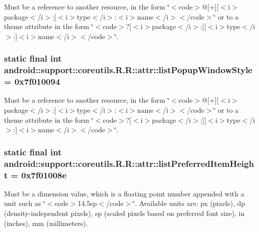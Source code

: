 Must be a reference to another resource, in the form \char`\"{}$<$code$>$@\mbox{[}+\mbox{]}\mbox{[}$<$i$>$package$<$/i$>$:\mbox{]}$<$i$>$type$<$/i$>$:$<$i$>$name$<$/i$>$$<$/code$>$\char`\"{} or to a theme attribute in the form \char`\"{}$<$code$>$?\mbox{[}$<$i$>$package$<$/i$>$:\mbox{]}\mbox{[}$<$i$>$type$<$/i$>$:\mbox{]}$<$i$>$name$<$/i$>$$<$/code$>$\char`\"{}. \hypertarget{classandroid_1_1support_1_1coreutils_1_1_r_1_1attr_4730c57033e903da9d16ba64f8d0acbf}{
\subsubsection[{listPopupWindowStyle}]{\setlength{\rightskip}{0pt plus 5cm}static final int android::support::coreutils.R.R::attr::listPopupWindowStyle = 0x7f010094}}
\label{classandroid_1_1support_1_1coreutils_1_1_r_1_1attr_4730c57033e903da9d16ba64f8d0acbf}


Must be a reference to another resource, in the form \char`\"{}$<$code$>$@\mbox{[}+\mbox{]}\mbox{[}$<$i$>$package$<$/i$>$:\mbox{]}$<$i$>$type$<$/i$>$:$<$i$>$name$<$/i$>$$<$/code$>$\char`\"{} or to a theme attribute in the form \char`\"{}$<$code$>$?\mbox{[}$<$i$>$package$<$/i$>$:\mbox{]}\mbox{[}$<$i$>$type$<$/i$>$:\mbox{]}$<$i$>$name$<$/i$>$$<$/code$>$\char`\"{}. \hypertarget{classandroid_1_1support_1_1coreutils_1_1_r_1_1attr_95e50876d6ddce173e2abf8286e5dc82}{
\subsubsection[{listPreferredItemHeight}]{\setlength{\rightskip}{0pt plus 5cm}static final int android::support::coreutils.R.R::attr::listPreferredItemHeight = 0x7f01008e}}
\label{classandroid_1_1support_1_1coreutils_1_1_r_1_1attr_95e50876d6ddce173e2abf8286e5dc82}


Must be a dimension value, which is a floating point number appended with a unit such as \char`\"{}$<$code$>$14.5sp$<$/code$>$\char`\"{}. Available units are: px (pixels), dp (density-independent pixels), sp (scaled pixels based on preferred font size), in (inches), mm (millimeters). 

